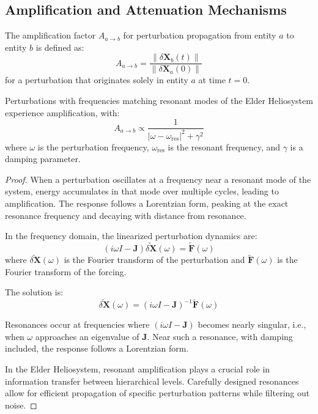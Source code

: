 \subsection{Amplification and Attenuation Mechanisms}

\begin{definition}
The amplification factor $A_{a \to b}$ for perturbation propagation from entity $a$ to entity $b$ is defined as:
\begin{equation}
A_{a \to b} = \frac{\|\delta\mathbf{X}_b(t)\|}{\|\delta\mathbf{X}_a(0)\|}
\end{equation}
for a perturbation that originates solely in entity $a$ at time $t=0$.
\end{definition}

\begin{theorem}
Perturbations with frequencies matching resonant modes of the Elder Heliosystem experience amplification, with:
\begin{equation}
A_{a \to b} \propto \frac{1}{|\omega - \omega_{\text{res}}|^2 + \gamma^2}
\end{equation}
where $\omega$ is the perturbation frequency, $\omega_{\text{res}}$ is the resonant frequency, and $\gamma$ is a damping parameter.
\end{theorem}

\begin{proof}
When a perturbation oscillates at a frequency near a resonant mode of the system, energy accumulates in that mode over multiple cycles, leading to amplification. The response follows a Lorentzian form, peaking at the exact resonance frequency and decaying with distance from resonance.

In the frequency domain, the linearized perturbation dynamics are:
\begin{equation}
(i\omega I - \mathbf{J}) \tilde{\delta\mathbf{X}}(\omega) = \tilde{\mathbf{F}}(\omega)
\end{equation}
where $\tilde{\delta\mathbf{X}}(\omega)$ is the Fourier transform of the perturbation and $\tilde{\mathbf{F}}(\omega)$ is the Fourier transform of the forcing.

The solution is:
\begin{equation}
\tilde{\delta\mathbf{X}}(\omega) = (i\omega I - \mathbf{J})^{-1} \tilde{\mathbf{F}}(\omega)
\end{equation}

Resonances occur at frequencies where $(i\omega I - \mathbf{J})$ becomes nearly singular, i.e., when $\omega$ approaches an eigenvalue of $\mathbf{J}$. Near such a resonance, with damping included, the response follows a Lorentzian form.

In the Elder Heliosystem, resonant amplification plays a crucial role in information transfer between hierarchical levels. Carefully designed resonances allow for efficient propagation of specific perturbation patterns while filtering out noise.
\end{proof}

